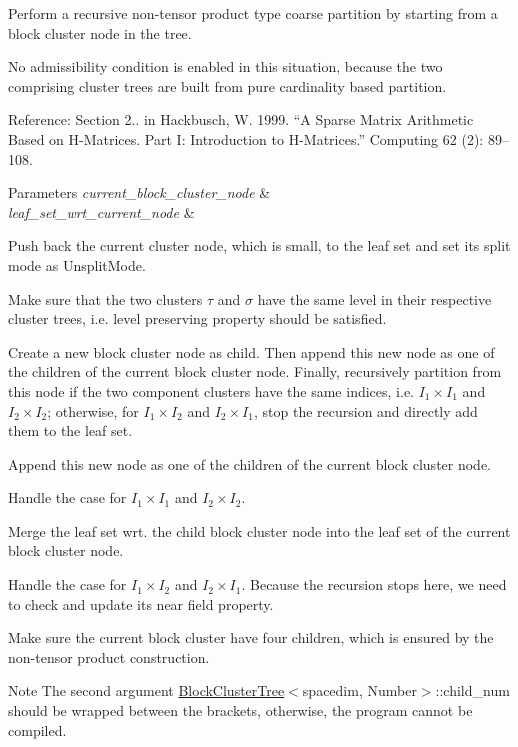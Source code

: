 Perform a recursive non-\/tensor product type coarse partition by starting from a block cluster node in the tree.

No admissibility condition is enabled in this situation, because the two comprising cluster trees are built from pure cardinality based partition.

Reference\+: Section 2.. in Hackbusch, W. 1999. “A Sparse Matrix Arithmetic Based on H-\/\+Matrices. Part I\+: Introduction to H-\/\+Matrices.” Computing 62 (2)\+: 89–108. 
\begin{DoxyParams}{Parameters}
{\em current\+\_\+block\+\_\+cluster\+\_\+node} & \\
\hline
{\em leaf\+\_\+set\+\_\+wrt\+\_\+current\+\_\+node} & \\
\hline
\end{DoxyParams}
Push back the current cluster node, which is small, to the leaf set and set its split mode as {\ttfamily Unsplit\+Mode}.

Make sure that the two clusters $\tau$ and $\sigma$ have the same level in their respective cluster trees, i.\+e. level preserving property should be satisfied.

Create a new block cluster node as child. Then append this new node as one of the children of the current block cluster node. Finally, recursively partition from this node if the two component clusters have the same indices, i.\+e. $I_1 \times I_1$ and $I_2 \times I_2$; otherwise, for $I_1 \times I_2$ and $I_2 \times I_1$, stop the recursion and directly add them to the leaf set.

Append this new node as one of the children of the current block cluster node.

Handle the case for $I_1 \times I_1$ and $I_2 \times I_2$.

Merge the leaf set wrt. the child block cluster node into the leaf set of the current block cluster node.

Handle the case for $I_1 \times I_2$ and $I_2 \times I_1$. Because the recursion stops here, we need to check and update its near field property.

Make sure the current block cluster have four children, which is ensured by the non-\/tensor product construction.


\begin{DoxyDescription}
\item[Note ]The second argument {\ttfamily \hyperlink{classBlockClusterTree}{Block\+Cluster\+Tree}$<$spacedim}, Number$>$\+::child\+\_\+num should be wrapped between the brackets, otherwise, the program cannot be compiled. 
\end{DoxyDescription}

